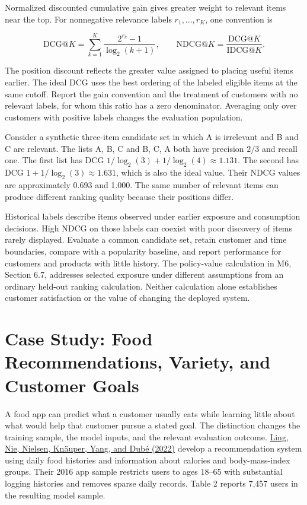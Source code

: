 Normalized discounted cumulative gain gives greater weight to relevant
items near the top. For nonnegative relevance labels \(r_1,\ldots,r_K\),
one convention is

\[
\mathrm{DCG}@K=\sum_{k=1}^{K}\frac{2^{r_k}-1}{\log_2(k+1)},
\qquad
\mathrm{NDCG}@K=\frac{\mathrm{DCG}@K}{\mathrm{IDCG}@K}.
\]

The position discount reflects the greater value assigned to placing
useful items earlier. The ideal DCG uses the best ordering of the
labeled eligible items at the same cutoff. Report the gain convention
and the treatment of customers with no relevant labels, for whom this
ratio has a zero denominator. Averaging only over customers with
positive labels changes the evaluation population.

Consider a synthetic three-item candidate set in which A is irrelevant
and B and C are relevant. The lists A, B, C and B, C, A both have
precision \(2/3\) and recall one. The first list has DCG
\(1/\log_2(3)+1/\log_2(4)\approx1.131\). The second has DCG
\(1+1/\log_2(3)\approx1.631\), which is also the ideal value. Their NDCG
values are approximately 0.693 and 1.000. The same number of relevant
items can produce different ranking quality because their positions
differ.

Historical labels describe items observed under earlier exposure and
consumption decisions. High NDCG on those labels can coexist with poor
discovery of items rarely displayed. Evaluate a common candidate set,
retain customer and time boundaries, compare with a popularity baseline,
and report performance for customers and products with little history.
The policy-value calculation in M6, Section 6.7, addresses selected
exposure under different assumptions from an ordinary held-out ranking
calculation. Neither calculation alone establishes customer satisfaction
or the value of changing the deployed system.

\hypertarget{M07-case-study-food-recommendations-variety-and-customer-goals}{%
\section{Case Study: Food Recommendations, Variety, and Customer
Goals}\label{M07-case-study-food-recommendations-variety-and-customer-goals}}

\noindent A food app can predict what a customer usually eats while learning
little about what would help that customer pursue a stated goal. The
distinction changes the training sample, the model inputs, and the
relevant evaluation outcome.
\href{https://doi.org/10.1145/3485447.3514193}{Ling, Nie, Nielsen,
Knäuper, Yang, and Dubé (2022)} develop a recommendation system using
daily food histories and information about calories and body-mass-index
groups. Their 2016 app sample restricts users to ages 18--65 with
substantial logging histories and removes sparse daily records. Table 2
reports 7,457 users in the resulting model sample.

